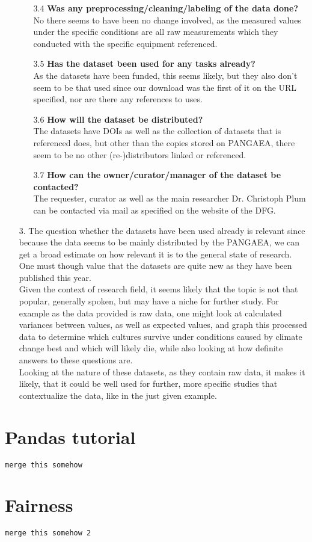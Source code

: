 \begin{itemize}
\begin{itemize}
                \item[3.4] \textbf{Was any preprocessing/cleaning/labeling of the data done?} \\
                    No there seems to have been no change involved, as the measured values under the specific conditions are all raw measurements which they conducted with the specific equipment referenced.
                \item[3.5] \textbf{Has the dataset been used for any tasks already?} \\
                    As the datasets have been funded, this seems likely, but they also don't seem to be that used since our download was the first of it on the URL specified, nor are there any references to uses.
                \item[3.6] \textbf{How will the dataset be distributed?} \\
                    The datasets have DOIs as well as the collection of datasets that is referenced does, but other than the copies stored on PANGAEA, there seem to be no other (re-)distributors linked or referenced.
                \item[3.7] \textbf{How can the owner/curator/manager of the dataset be contacted?} \\
                    The requester, curator as well as the main researcher Dr. Christoph Plum can be contacted via mail as specified on the website of the DFG.
            \end{itemize}
        \item[3.] The question whether the datasets have been used already is relevant since because the data seems to be mainly distributed by the PANGAEA, we can get a broad estimate on how relevant it is to the general state of research. One must though value that the datasets are quite new as they have been published this year. \\
        Given the context of research field, it seems likely that the topic is not that popular, generally spoken, but may have a niche for further study. For example as the data provided is raw data, one might look at calculated variances between values, as well as expected values, and graph this processed data to determine which cultures survive under conditions caused by climate change best and which will likely die, while also looking at how definite answers to these questions are. \\
        Looking at the nature of these datasets, as they contain raw data, it makes it likely, that it could be well used for further, more specific studies that contextualize the data, like in the just given example.
    \end{itemize}
    \section{Pandas tutorial}
    \verb|merge this somehow|
    \section{Fairness}
    \verb|merge this somehow 2|

